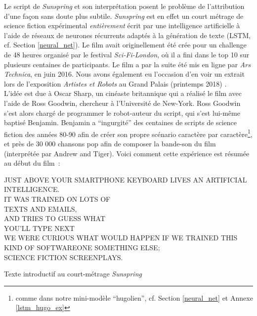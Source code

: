 \documentclass{article}
\newenvironment{citationbox}
{\begin{center}
		\begin{minipage}{.8\textwidth}
		}
		{
		\end{minipage}	
\end{center}
}
\begin{document}
					Le script de \textit{Sunspring} et son interprétation \cite{sunspring} posent le problème de l'attribution d'une façon sans doute plus subtile. \textit{Sunspring} est en effet un court métrage de science fiction expérimental \textit{entièrement} écrit par une intelligence artificielle à l'aide de réseaux de neurones récurrents adaptés à la génération de texte (LSTM, cf. Section \ref{neural_net}). Le film avait originellement été crée pour un challenge de 48 heures organisé par le festival \textit{Sci-Fi-London}, où il a fini dans le top 10 sur plusieurs centaines de participants. Le film a par la suite été mis en ligne par \textit{Ars Technica}, en juin 2016. Nous avons également eu l'occasion d'en voir un extrait lors de l'exposition \textit{Artistes et Robots} au Grand Palais (printemps 2018) \cite{artistes_robots}.\\
					
					L'idée est due à Oscar Sharp, un cinéaste britannique qui a réalisé le film avec l'aide de Ross Goodwin, chercheur à l'Université de New-York. Ross Goodwin s'est alors chargé de programmer le robot-auteur du script, qui s'est lui-même baptisé Benjamin. Benjamin a ``ingurgité'' des centaines de scripts de science fiction des années 80-90 afin de créer son propre scénario caractère par caractère\footnote{comme dans notre mini-modèle ``hugolien'', cf. Section \ref{neural_net} et Annexe \ref{lstm_hugo_ex}}, et près de 30 000 chansons pop afin de composer la bande-son du film (interprétée par Andrew and Tiger). Voici comment cette expérience est résumée au début du film~:
					
					\begin{citationbox}
						JUST ABOVE YOUR SMARTPHONE KEYBOARD LIVES AN ARTIFICIAL INTELLIGENCE.\\
						IT WAS TRAINED ON LOTS OF\\
						TEXTS AND EMAILS,\\
						AND TRIES TO GUESS WHAT\\
						YOU'LL TYPE NEXT\\
						
						WE WERE CURIOUS WHAT WOULD HAPPEN IF WE TRAINED THIS KIND OF SOFTWAREONE SOMETHING ELSE;\\
						
						SCIENCE FICTION SCREENPLAYS.
						\begin{flushright}
							Texte introductif au court-métrage  \textit{Sunspring}
						\end{flushright}
					\end{citationbox}
					
\end{document}
